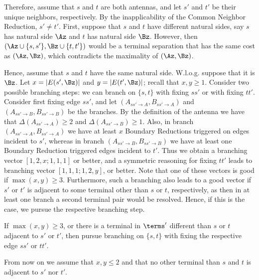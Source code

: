 Therefore, assume that $s$ and $t$ are both antennas, and let $s'$ and $t'$ be their unique neighbors, respectively. By the inapplicability of the Common Neighbor Reduction, $s' \neq t'$. First, suppose that $s$ and $t$ have different natural sides, say $s$ has natural side $\Az$ and $t$ has natural side $\Bz$. However, then $(\Az\cup \{s,s'\},\Bz\cup \{t,t'\})$ would be a terminal separation that has the same cost as $(\Az,\Bz)$, which contradicts the maximality of $(\Az,\Bz)$.

Hence, assume that $s$ and $t$ have the same natural side. W.l.o.g. suppose that it is $\Bz$. Let $x=|E(s',\Bz)|$ and $y=|E(t',\Bz)|$; recall that $x,y\geq 1$. Consider two possible branching steps: we can branch on $\{s,t\}$ with fixing $ss'$ or with fixing $tt'$. Consider first fixing edge $ss'$, and let $(A_{ss'\to A},B_{ss'\to A})$ and $(A_{ss'\to B},B_{ss'\to B})$ be the branches. By the definition of the antenna we have that $\Delta(A_{ss'\to A})\geq 2$ and $\Delta(A_{ss'\to B})\geq 1$. Also, in branch $(A_{ss'\to A},B_{ss'\to A})$ we have at least $x$ Boundary Reductions triggered on edges incident to $s'$, whereas in branch $(A_{ss'\to B},B_{ss'\to B})$ we have at least one Boundary Reduction triggered edges incident to $t'$. Thus we obtain a branching vector $[1,2,x;1,1,1]$ or better, and a symmetric reasoning for fixing $tt'$ leads to branching vector $[1,1,1;1,2,y]$, or better. Note that one of these vectors is good if $\max(x,y)\geq 3$.
Furthermore, such a branching also leads to a good vector if $s'$ or $t'$ is adjacent to some terminal other than $s$ or $t$, respectively,
  as then in at least one branch a second terminal pair would be resolved.
Hence, if this is the case, we pursue the respective branching step.

\begin{branching}
If $\max(x,y)\geq 3$, or there is a terminal in $\terms'$ different than $s$ or $t$ adjacent to $s'$ or $t'$,
then pursue branching on $\{s,t\}$ with fixing the respective edge $ss'$ or $tt'$.
\end{branching}

From now on we assume that $x,y\leq 2$ and that no other terminal than $s$ and $t$ is adjacent to $s'$ nor $t'$.

